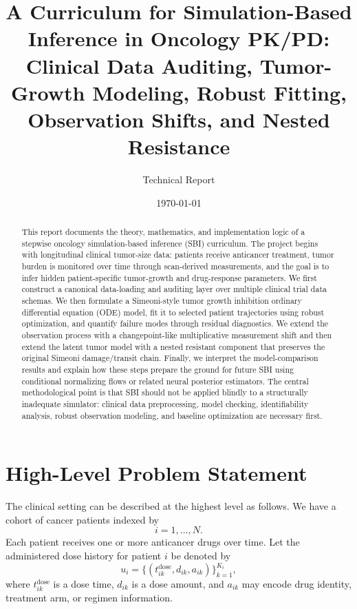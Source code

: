 \documentclass[11pt,a4paper]{article}
\title{A Curriculum for Simulation-Based Inference in Oncology PK/PD: Clinical Data Auditing, Tumor-Growth Modeling, Robust Fitting, Observation Shifts, and Nested Resistance}
\author{Technical Report}
\date{\today}
\begin{document}
\maketitle

\begin{abstract}
This report documents the theory, mathematics, and implementation logic of a stepwise oncology simulation-based inference (SBI) curriculum. The project begins with longitudinal clinical tumor-size data: patients receive anticancer treatment, tumor burden is monitored over time through scan-derived measurements, and the goal is to infer hidden patient-specific tumor-growth and drug-response parameters. We first construct a canonical data-loading and auditing layer over multiple clinical trial data schemas. We then formulate a Simeoni-style tumor growth inhibition ordinary differential equation (ODE) model, fit it to selected patient trajectories using robust optimization, and quantify failure modes through residual diagnostics. We extend the observation process with a changepoint-like multiplicative measurement shift and then extend the latent tumor model with a nested resistant component that preserves the original Simeoni damage/transit chain. Finally, we interpret the model-comparison results and explain how these steps prepare the ground for future SBI using conditional normalizing flows or related neural posterior estimators. The central methodological point is that SBI should not be applied blindly to a structurally inadequate simulator: clinical data preprocessing, model checking, identifiability analysis, robust observation modeling, and baseline optimization are necessary first.
\end{abstract}

\tableofcontents
\newpage

\section{High-Level Problem Statement}

The clinical setting can be described at the highest level as follows. We have a cohort of cancer patients indexed by
\[
    i = 1,\ldots,N.
\]
Each patient receives one or more anticancer drugs over time. Let the administered dose history for patient $i$ be denoted by
\[
    u_i = \{(t_{ik}^{\mathrm{dose}}, d_{ik}, a_{ik})\}_{k=1}^{K_i},
\]
where $t_{ik}^{\mathrm{dose}}$ is a dose time, $d_{ik}$ is a dose amount, and $a_{ik}$ may encode drug identity, treatment arm, or regimen information.
\end{document}
